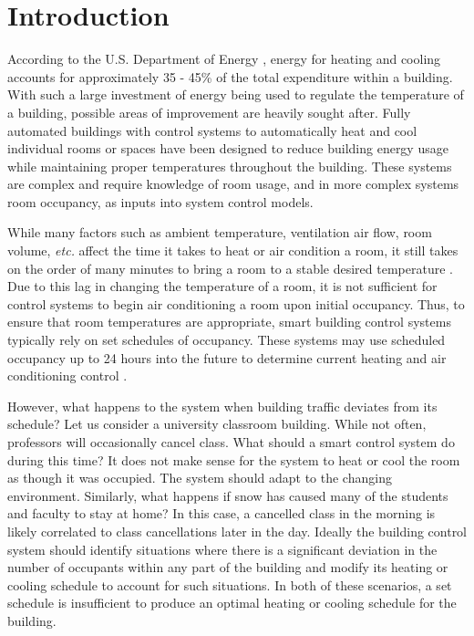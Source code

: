 \chapter{Introduction}
According to the U.S. Department of Energy \cite{DOE2010}, energy for heating and cooling accounts for approximately 35 - 45\% of the total expenditure within a building.  With such a large investment of energy being used to regulate the temperature of a building, possible areas of improvement are heavily sought after.  Fully automated buildings with control systems to automatically heat and cool individual rooms or spaces have been designed \cite{Balan2009, Gwerder2008} to reduce building energy usage while maintaining proper temperatures throughout the building.  These systems are complex and require knowledge of room usage, and in more complex systems room occupancy, as inputs into system control models.
	
While many factors such as ambient temperature, ventilation air flow, room volume, \textit{etc.} affect the time it takes to heat or air condition a room, it still takes on the order of many minutes to bring a room to a stable desired temperature \cite{yang2004}.  Due to this lag in changing the temperature of a room, it is not sufficient for control systems to begin air conditioning a room upon initial occupancy.   Thus, to ensure that room temperatures are appropriate, smart building control systems typically rely on set schedules of occupancy.  These systems may use scheduled occupancy up to 24 hours into the future to determine current heating and air conditioning control \cite{Ma2010}.  

However, what happens to the system when building traffic deviates from its schedule?  Let us consider a university classroom building.  While not often, professors will occasionally cancel class.  What should a smart control system do during this time?  It does not make sense for the system to heat or cool the room as though it was occupied.  The system should adapt to the changing environment.  Similarly, what happens if snow has caused many of the students and faculty to stay at home?  In this case, a cancelled class in the morning is likely correlated to class cancellations later in the day.  Ideally the building control system should identify situations where there is a significant deviation in the number of occupants within any part of the building and modify its heating or cooling schedule to account for such situations.  In both of these scenarios, a set schedule is insufficient to produce an optimal heating or cooling schedule for the building.


